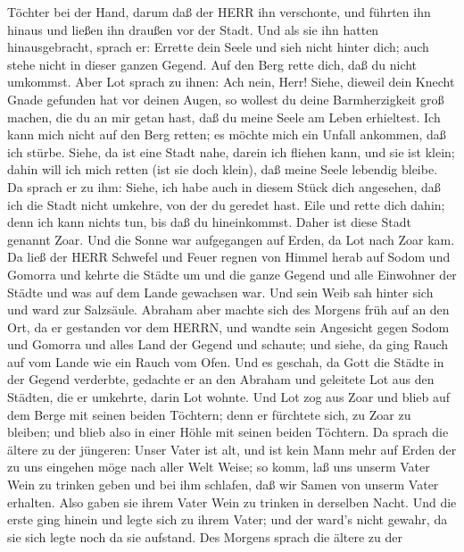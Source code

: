 Töchter bei der Hand, darum daß der HERR ihn verschonte, und führten ihn
hinaus und ließen ihn draußen vor der Stadt.  Und als sie
ihn hatten hinausgebracht, sprach er: Errette dein Seele und sieh nicht
hinter dich; auch stehe nicht in dieser ganzen Gegend. Auf den Berg
rette dich, daß du nicht umkommst.  Aber Lot sprach zu
ihnen: Ach nein, Herr!  Siehe, dieweil dein Knecht Gnade
gefunden hat vor deinen Augen, so wollest du deine Barmherzigkeit groß
machen, die du an mir getan hast, daß du meine Seele am Leben
erhieltest. Ich kann mich nicht auf den Berg retten; es möchte mich ein
Unfall ankommen, daß ich stürbe.  Siehe, da ist eine Stadt
nahe, darein ich fliehen kann, und sie ist klein; dahin will ich mich
retten (ist sie doch klein), daß meine Seele lebendig bleibe.
 Da sprach er zu ihm: Siehe, ich habe auch in diesem Stück
dich angesehen, daß ich die Stadt nicht umkehre, von der du geredet
hast.  Eile und rette dich dahin; denn ich kann nichts tun,
bis daß du hineinkommst. Daher ist diese Stadt genannt Zoar.
 Und die Sonne war aufgegangen auf Erden, da Lot nach Zoar
kam.  Da ließ der HERR Schwefel und Feuer regnen von Himmel
herab auf Sodom und Gomorra  und kehrte die Städte um und
die ganze Gegend und alle Einwohner der Städte und was auf dem Lande
gewachsen war.  Und sein Weib sah hinter sich und ward zur
Salzsäule.  Abraham aber machte sich des Morgens früh auf
an den Ort, da er gestanden vor dem HERRN,  und wandte sein
Angesicht gegen Sodom und Gomorra und alles Land der Gegend und schaute;
und siehe, da ging Rauch auf vom Lande wie ein Rauch vom Ofen.
 Und es geschah, da Gott die Städte in der Gegend
verderbte, gedachte er an den Abraham und geleitete Lot aus den Städten,
die er umkehrte, darin Lot wohnte.  Und Lot zog aus Zoar
und blieb auf dem Berge mit seinen beiden Töchtern; denn er fürchtete
sich, zu Zoar zu bleiben; und blieb also in einer Höhle mit seinen
beiden Töchtern.  Da sprach die ältere zu der jüngeren:
Unser Vater ist alt, und ist kein Mann mehr auf Erden der zu uns
eingehen möge nach aller Welt Weise;  so komm, laß uns
unserm Vater Wein zu trinken geben und bei ihm schlafen, daß wir Samen
von unserm Vater erhalten.  Also gaben sie ihrem Vater Wein
zu trinken in derselben Nacht. Und die erste ging hinein und legte sich
zu ihrem Vater; und der ward's nicht gewahr, da sie sich legte noch da
sie aufstand.  Des Morgens sprach die ältere zu der
